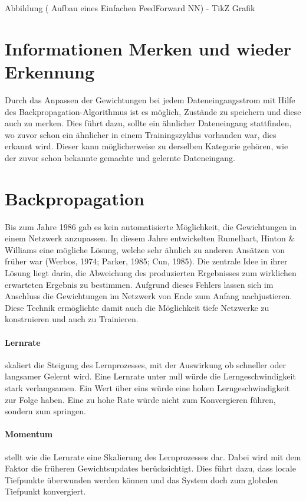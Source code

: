 Abbildung ( Aufbau eines Einfachen FeedForward NN) - TikZ Grafik

\section{Informationen Merken und wieder Erkennung}

Durch das Anpassen der Gewichtungen bei jedem Dateneingangsstrom mit Hilfe des Backpropagation-Algorithmus ist es möglich, Zustände zu speichern und diese auch zu merken. 
Dies führt dazu, sollte ein ähnlicher Dateneingang stattfinden, wo zuvor schon ein ähnlicher in einem Trainingszyklus vorhanden war, dies erkannt wird. %
Dieser kann möglicherweise zu derselben Kategorie gehören, wie der zuvor schon bekannte gemachte und gelernte Dateneingang.

\section{Backpropagation}
\label{sec:Backpropagation}

Bis zum Jahre 1986 gab es kein automatisierte Möglichkeit, die Gewichtungen in einem Netzwerk anzupassen.
In diesem Jahre entwickelten Rumelhart, Hinton \& Williams eine mögliche Lösung, welche sehr ähnlich zu anderen Ansätzen von früher war (Werbos, 1974; Parker, 1985; Cun, 1985).
Die zentrale Idee in ihrer Lösung liegt darin, die Abweichung des produzierten Ergebnisses zum wirklichen erwarteten Ergebnis zu bestimmen. 
Aufgrund dieses Fehlers lassen sich im Anschluss die Gewichtungen im Netzwerk von Ende zum Anfang nachjustieren. 
Diese Technik ermöglichte damit auch die Möglichkeit tiefe Netzwerke zu konstruieren und auch zu Trainieren.

\paragraph{Lernrate} skaliert die Steigung des Lernprozesses, mit der Auswirkung ob schneller oder langsamer Gelernt wird.
Eine Lernrate unter null würde die Lerngeschwindigkeit stark verlangsamen. 
Ein Wert über eins würde eine hohen Lerngeschwindigkeit zur Folge haben. 
Eine zu hohe Rate würde nicht zum Konvergieren führen, sondern zum springen.

\paragraph{Momentum} stellt wie die Lernrate eine Skalierung des Lernprozesses dar.
Dabei wird mit dem Faktor die früheren Gewichtsupdates berücksichtigt. 
Dies führt dazu, dass locale Tiefpunkte überwunden werden können und das System doch zum globalen Tiefpunkt konvergiert.

